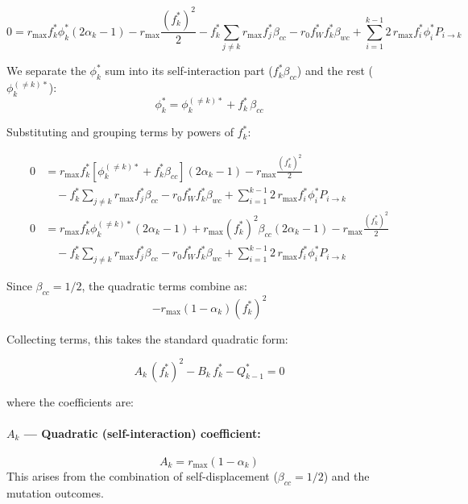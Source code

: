 \documentclass[11pt,a4paper]{article}
\begin{document}
\begin{equation}
    0 = r_{\text{max}} f_k^* \phi_k^* (2\alpha_k - 1) - r_{\text{max}} \frac{(f_k^*)^2}{2} - f_k^* \sum_{j \neq k} r_{\text{max}} f_j^* \beta_{cc} - r_0 f_W^* f_k^* \beta_{wc} + \sum_{i=1}^{k-1} 2\, r_{\text{max}} f_i^* \phi_i^* P_{i \to k}
\end{equation}

We separate the $\phi_k^*$ sum into its self-interaction part ($f_k^* \beta_{cc}$) and the rest ($\phi_k^{(\neq k)*}$):
\begin{equation}
    \phi_k^* = \phi_k^{(\neq k)*} + f_k^*\,\beta_{cc}
\end{equation}

Substituting and grouping terms by powers of $f_k^*$:

\begin{align}
    0 &= r_{\text{max}} f_k^* \left[\phi_k^{(\neq k)*} + f_k^* \beta_{cc}\right] (2\alpha_k - 1) - r_{\text{max}} \frac{(f_k^*)^2}{2} \nonumber \\
      &\quad - f_k^* \sum_{j \neq k} r_{\text{max}} f_j^* \beta_{cc} - r_0 f_W^* f_k^* \beta_{wc} + \sum_{i=1}^{k-1} 2\, r_{\text{max}} f_i^* \phi_i^* P_{i \to k} \nonumber \\
    0 &= r_{\text{max}} f_k^* \phi_k^{(\neq k)*} (2\alpha_k - 1) + r_{\text{max}} (f_k^*)^2 \beta_{cc} (2\alpha_k - 1) - r_{\text{max}} \frac{(f_k^*)^2}{2} \nonumber \\
      &\quad - f_k^* \sum_{j \neq k} r_{\text{max}} f_j^* \beta_{cc} - r_0 f_W^* f_k^* \beta_{wc} + \sum_{i=1}^{k-1} 2\, r_{\text{max}} f_i^* \phi_i^* P_{i \to k}
\end{align}

Since $\beta_{cc} = 1/2$, the quadratic terms combine as:
\begin{equation}
    -r_{\text{max}} (1 - \alpha_k) (f_k^*)^2
\end{equation}

Collecting terms, this takes the standard quadratic form:

\begin{equation}
    A_k\,(f_k^*)^2 - B_k\,f_k^* - Q_{k-1}^* = 0
\end{equation}

where the coefficients are:

\paragraph{$A_k$ --- Quadratic (self-interaction) coefficient:}
\begin{equation}
    A_k = r_{\text{max}} (1 - \alpha_k)
\end{equation}
This arises from the combination of self-displacement ($\beta_{cc} = 1/2$) and the mutation outcomes.
\end{document}
